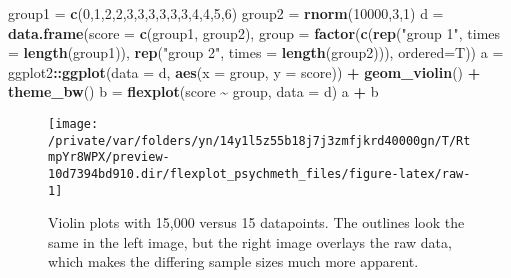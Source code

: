 \documentclass[
  english,
  man]{apa6}
\newenvironment{Shaded}{\begin{snugshade}}{\end{snugshade}}
\newcommand{\DataTypeTok}[1]{\textcolor[rgb]{0.13,0.29,0.53}{#1}}
\newcommand{\DecValTok}[1]{\textcolor[rgb]{0.00,0.00,0.81}{#1}}
\newcommand{\KeywordTok}[1]{\textcolor[rgb]{0.13,0.29,0.53}{\textbf{#1}}}
\newcommand{\NormalTok}[1]{#1}
\newcommand{\OperatorTok}[1]{\textcolor[rgb]{0.81,0.36,0.00}{\textbf{#1}}}
\newcommand{\StringTok}[1]{\textcolor[rgb]{0.31,0.60,0.02}{#1}}
\begin{document}
\small

\begin{Shaded}
\begin{Highlighting}[]
\NormalTok{group1 =}\StringTok{ }\KeywordTok{c}\NormalTok{(}\DecValTok{0}\NormalTok{,}\DecValTok{1}\NormalTok{,}\DecValTok{2}\NormalTok{,}\DecValTok{2}\NormalTok{,}\DecValTok{3}\NormalTok{,}\DecValTok{3}\NormalTok{,}\DecValTok{3}\NormalTok{,}\DecValTok{3}\NormalTok{,}\DecValTok{3}\NormalTok{,}\DecValTok{3}\NormalTok{,}\DecValTok{4}\NormalTok{,}\DecValTok{4}\NormalTok{,}\DecValTok{5}\NormalTok{,}\DecValTok{6}\NormalTok{)}
\NormalTok{group2 =}\StringTok{ }\KeywordTok{rnorm}\NormalTok{(}\DecValTok{10000}\NormalTok{,}\DecValTok{3}\NormalTok{,}\DecValTok{1}\NormalTok{)}
\NormalTok{d =}\StringTok{ }\KeywordTok{data.frame}\NormalTok{(}\DataTypeTok{score =} \KeywordTok{c}\NormalTok{(group1, group2), }
               \DataTypeTok{group =} \KeywordTok{factor}\NormalTok{(}\KeywordTok{c}\NormalTok{(}\KeywordTok{rep}\NormalTok{(}\StringTok{"group 1"}\NormalTok{, }\DataTypeTok{times =} \KeywordTok{length}\NormalTok{(group1)), }
                       \KeywordTok{rep}\NormalTok{(}\StringTok{"group 2"}\NormalTok{, }\DataTypeTok{times =} \KeywordTok{length}\NormalTok{(group2))), }\DataTypeTok{ordered=}\NormalTok{T))}
\NormalTok{a =}\StringTok{ }\NormalTok{ggplot2}\OperatorTok{::}\KeywordTok{ggplot}\NormalTok{(}\DataTypeTok{data =}\NormalTok{ d, }\KeywordTok{aes}\NormalTok{(}\DataTypeTok{x =}\NormalTok{ group, }\DataTypeTok{y =}\NormalTok{ score)) }\OperatorTok{+}\StringTok{  }
\StringTok{  }\KeywordTok{geom\_violin}\NormalTok{() }\OperatorTok{+}\StringTok{ }\KeywordTok{theme\_bw}\NormalTok{()}
\NormalTok{b =}\StringTok{ }\KeywordTok{flexplot}\NormalTok{(score }\OperatorTok{\textasciitilde{}}\StringTok{ }\NormalTok{group, }\DataTypeTok{data =}\NormalTok{ d)}
\NormalTok{a }\OperatorTok{+}\StringTok{ }\NormalTok{b}
\end{Highlighting}
\end{Shaded}

\begin{figure}

{\centering \texttt{[image: /private/var/folders/yn/14y1l5z55b18j7j3zmfjkrd40000gn/T/RtmpYr8WPX/preview-10d7394bd910.dir/flexplot\_psychmeth\_files/figure-latex/raw-1]} 

}

\caption{Violin plots with 15,000 versus 15 datapoints. The outlines look the same in the left image, but the right image overlays the raw data, which makes the differing sample sizes much more apparent. \label{fig:raw}}\label{fig:raw}
\end{figure}
\end{document}
